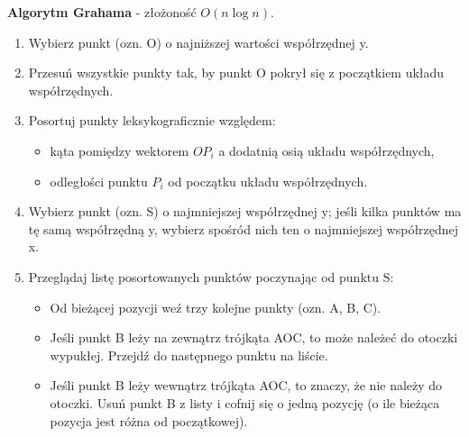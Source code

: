 \documentclass[12pt]{article}
\begin{document}
    \begin{definition}
        \textbf{Algorytm Grahama} - złożoność $O(n \log n)$.
        \begin{enumerate}
            \item Wybierz punkt (ozn. O) o najniższej wartości współrzędnej y.
            \item Przesuń wszystkie punkty tak, by punkt O pokrył się z początkiem układu współrzędnych.
            \item Posortuj punkty leksykograficznie względem:
            \begin{itemize}
                \item kąta pomiędzy wektorem $OP_i$ a dodatnią osią układu współrzędnych,
                \item odległości punktu $P_i$ od początku układu współrzędnych.
            \end{itemize}
            \item Wybierz punkt (ozn. S) o najmniejszej współrzędnej y; jeśli kilka punktów ma tę samą współrzędną
            y, wybierz spośród nich ten o najmniejszej współrzędnej x.
            \item Przeglądaj listę posortowanych punktów poczynając od punktu S:
            \begin{itemize}
                \item Od bieżącej pozycji weź trzy kolejne punkty (ozn. A, B, C).
                \item Jeśli punkt B leży na zewnątrz trójkąta AOC, to może należeć do otoczki wypukłej. Przejdź do następnego punktu na liście.
                \item Jeśli punkt B leży wewnątrz trójkąta AOC, to znaczy, że nie należy do otoczki. Usuń punkt B z listy i cofnij się o jedną pozycję (o ile bieżąca pozycja jest różna od początkowej).
            \end{itemize}
        \end{enumerate}
    \end{definition}
\end{document}
